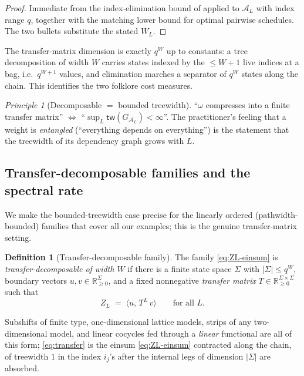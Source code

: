 \documentclass[11pt]{article}
\newcommand{\bbR}{\mathbb{R}}
\newcommand{\calA}{\mathcal{A}}
\newcommand{\tw}{\mathsf{tw}}
\newcommand{\treewidthp}[1]{\tw(#1)}
\newcommand{\graphform}[1]{G_{#1}}
\theoremstyle{plain}
\theoremstyle{definition}
\newtheorem{definition}[theorem]{Definition}
\theoremstyle{remark}
\newtheorem{principle}[theorem]{Principle}
\begin{document}
\begin{proof}
Immediate from the index-elimination bound of \citet[Prop.~1]{chen2024ustats}
applied to $\calA_L$ with index range $q$, together with the matching lower bound
for optimal pairwise schedules. The two bullets substitute the stated $W_L$.
\end{proof}

The transfer-matrix dimension is exactly $q^{W}$ up to constants: a tree
decomposition of width $W$ carries states indexed by the $\le W{+}1$ live indices
at a bag, i.e.\ $q^{W+1}$ values, and elimination marches a separator of $q^{W}$
states along the chain. This identifies the two folklore cost measures.

\begin{principle}[Decomposable $=$ bounded treewidth]
\label{prin:dichotomy}
``$\omega$ compresses into a finite transfer matrix'' $\iff$
``$\sup_L\treewidthp{\graphform{\calA_L}}<\infty$''. The practitioner's feeling
that a weight is \emph{entangled} (``everything depends on everything'') is the
statement that the treewidth of its dependency graph grows with $L$.
\end{principle}

\subsection{Transfer-decomposable families and the spectral rate}

We make the bounded-treewidth case precise for the linearly ordered (pathwidth-%
bounded) families that cover all our examples; this is the genuine
transfer-matrix setting.

\begin{definition}[Transfer-decomposable family]
\label{def:transfer-decomp}
The family \eqref{eq:ZL-einsum} is \emph{transfer-decomposable of width $W$} if
there is a finite state space $\Sigma$ with $|\Sigma|\le q^{W}$, boundary vectors
$u,v\in\bbR_{\ge0}^{\Sigma}$, and a fixed nonnegative \emph{transfer matrix}
$T\in\bbR_{\ge0}^{\Sigma\times\Sigma}$ such that
\begin{equation}
\label{eq:transfer}
   Z_L \;=\; \langle u,\,T^{L}\,v\rangle\qquad\text{for all }L.
\end{equation}
\end{definition}

Subshifts of finite type, one-dimensional lattice models, strips of any
two-dimensional model, and linear cocycles fed through a \emph{linear} functional
are all of this form; \eqref{eq:transfer} is the einsum
\eqref{eq:ZL-einsum} contracted along the chain, of treewidth $1$ in the index
$i_j$'s after the internal legs of dimension $|\Sigma|$ are absorbed.
\end{document}
